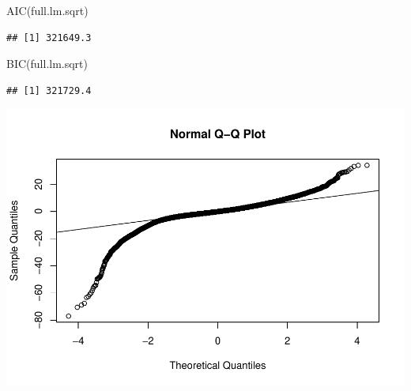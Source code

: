 \documentclass[
]{book}
\newenvironment{Shaded}{\begin{snugshade}}{\end{snugshade}}
\newcommand{\FunctionTok}[1]{\textcolor[rgb]{0.00,0.00,0.00}{#1}}
\newcommand{\NormalTok}[1]{#1}
\newcommand{\SpecialCharTok}[1]{\textcolor[rgb]{0.00,0.00,0.00}{#1}}
\begin{document}
\begin{Shaded}
\begin{Highlighting}[]
\FunctionTok{AIC}\NormalTok{(full.lm.sqrt)}
\end{Highlighting}
\end{Shaded}

\begin{verbatim}
## [1] 321649.3
\end{verbatim}

\begin{Shaded}
\begin{Highlighting}[]
\FunctionTok{BIC}\NormalTok{(full.lm.sqrt)}
\end{Highlighting}
\end{Shaded}

\begin{verbatim}
## [1] 321729.4
\end{verbatim}

\begin{Shaded}
\end{Shaded}

\includegraphics{13-MultipleLinearRegression_files/figure-latex/unnamed-chunk-7-1.pdf}

\begin{Shaded}
\end{Shaded}
\end{document}
